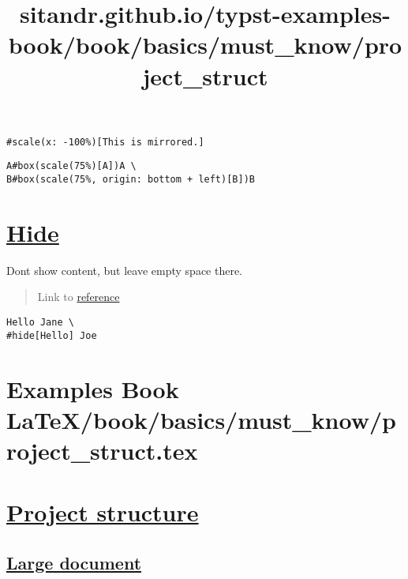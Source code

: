 \begin{verbatim}
#scale(x: -100%)[This is mirrored.]
\end{verbatim}

\pandocbounded{}

\begin{verbatim}
A#box(scale(75%)[A])A \
B#box(scale(75%, origin: bottom + left)[B])B
\end{verbatim}

\pandocbounded{}

\section{\texorpdfstring{\hyperref[hide]{Hide}}{Hide}}\label{hide}

Don\textquotesingle t show content, but leave empty space there.

\begin{quote}
Link to \href{https://typst.app/docs/reference/layout/hide/}{reference}
\end{quote}

\begin{verbatim}
Hello Jane \
#hide[Hello] Joe
\end{verbatim}

\pandocbounded{}


\section{Examples Book LaTeX/book/basics/must_know/project_struct.tex}
\title{sitandr.github.io/typst-examples-book/book/basics/must_know/project_struct}

\section{\texorpdfstring{\hyperref[project-structure]{Project
structure}}{Project structure}}\label{project-structure}

\subsection{\texorpdfstring{\hyperref[large-document]{Large
document}}{Large document}}\label{large-document}

